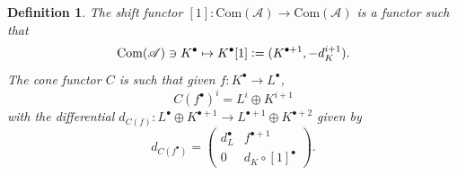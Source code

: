 \documentclass[10pt]{article}
\numberwithin{equation}{section}
\newtheorem{definition}{Definition}[section]
\newcommand{\defeq}{\vcentcolon=}
\newcommand{\sA}[0]{\mathscr{A}}
\newcommand{\Com}[0]{\mathrm{Com}}
\begin{document}
\begin{definition}
    The shift functor $[1]:\Com(\sA)\to\Com(\sA)$ is a functor such that 
    \begin{equation*}
        \Com(\sA)\ni K^\bullet\mapsto K^\bullet[1] \defeq (K^{\bullet+1},-d_K^{i+1}).
    \end{equation*}
    The cone functor $C$ is such that given $f:K^\bullet\to L^\bullet$,
    \begin{equation*}
        C(f^\bullet)^i = L^i\oplus K^{i+1}
    \end{equation*}
    with the differential $d_{C(f)}:L^\bullet\oplus K^{\bullet+1}\to L^{\bullet+1}\oplus K^{\bullet+2}$ given by 
    \begin{equation*}
        d_{C(f^\bullet)}=\begin{pmatrix}
            d_L^\bullet & f^{\bullet+1}\\
            0 & d_K\circ[1]^\bullet
        \end{pmatrix}.
    \end{equation*}
\end{definition}
\end{document}
